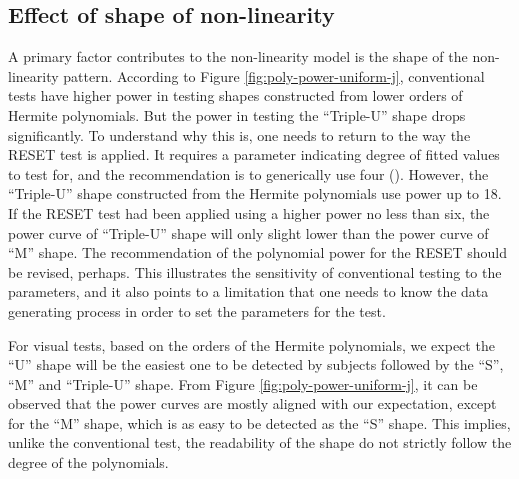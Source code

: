 \documentclass[]{interact}
\theoremstyle{plain}%
\theoremstyle{definition}
\theoremstyle{remark}
\begin{document}
\hypertarget{effect-of-shape-of-non-linearity}{%
\subsection{Effect of shape of
non-linearity}\label{effect-of-shape-of-non-linearity}}

A primary factor contributes to the non-linearity model is the shape of
the non-linearity pattern. According to Figure
\ref{fig:poly-power-uniform-j}, conventional tests have higher power in
testing shapes constructed from lower orders of Hermite polynomials. But
the power in testing the ``Triple-U'' shape drops significantly. To
understand why this is, one needs to return to the way the RESET test is
applied. It requires a parameter indicating degree of fitted values to
test for, and the recommendation is to generically use four
(\citet{ramsey_tests_1969}). However, the ``Triple-U'' shape constructed
from the Hermite polynomials use power up to 18. If the RESET test had
been applied using a higher power no less than six, the power curve of
``Triple-U'' shape will only slight lower than the power curve of ``M''
shape. The recommendation of the polynomial power for the RESET should
be revised, perhaps. This illustrates the sensitivity of conventional
testing to the parameters, and it also points to a limitation that one
needs to know the data generating process in order to set the parameters
for the test.

For visual tests, based on the orders of the Hermite polynomials, we
expect the ``U'' shape will be the easiest one to be detected by
subjects followed by the ``S'', ``M'' and ``Triple-U'' shape. From
Figure \ref{fig:poly-power-uniform-j}, it can be observed that the power
curves are mostly aligned with our expectation, except for the ``M''
shape, which is as easy to be detected as the ``S'' shape. This implies,
unlike the conventional test, the readability of the shape do not
strictly follow the degree of the polynomials.
\end{document}
